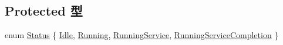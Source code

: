 \subsection*{Protected 型}
\begin{DoxyCompactItemize}
\item 
enum \hyperlink{classBaseKvmCPU_a67a0db04d321a74b7e7fcfd3f1a3f70b}{Status} \{ \hyperlink{classBaseKvmCPU_a67a0db04d321a74b7e7fcfd3f1a3f70bad3fa9ae9431d6cb1772f9d9df48cab19}{Idle}, 
\hyperlink{classBaseKvmCPU_a67a0db04d321a74b7e7fcfd3f1a3f70ba2f5f2c4a8c4f4f0519d503dcdfbf55cb}{Running}, 
\hyperlink{classBaseKvmCPU_a67a0db04d321a74b7e7fcfd3f1a3f70ba30f0df86d1d54bb5ea7ee293977f73df}{RunningService}, 
\hyperlink{classBaseKvmCPU_a67a0db04d321a74b7e7fcfd3f1a3f70ba8d38f5f3c8c186646364b893e12e6ae0}{RunningServiceCompletion}
 \}
\end{DoxyCompactItemize}
